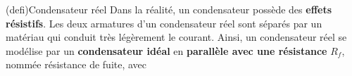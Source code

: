 \documentclass[../../main/main.tex]{subfiles}
\begin{document}
\begin{tcb*}[sidebyside, righthand ratio=.3](defi){Condensateur réel}
	Dans la réalité, un condensateur possède des \textbf{effets résistifs}.
	Les deux armatures d'un condensateur réel sont séparés par un matériau qui
	conduit très légèrement le courant. Ainsi, un condensateur réel se
	modélise par un \textbf{condensateur idéal} en \textbf{parallèle avec une
		résistance} $R_f$, nommée résistance de fuite, avec
	\vspace{-15pt}
	\tcblower
	\begin{center}
		\vspace{-15pt}
		\label{fig:creel}
	\end{center}
\end{tcb*}
\end{document}
